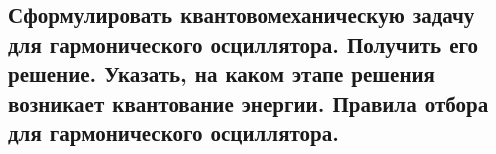 \subsection{Сформулировать квантовомеханическую задачу для гармонического осциллятора. Получить
его решение. Указать, на каком этапе решения возникает квантование энергии. Правила отбора
для гармонического осциллятора.}
